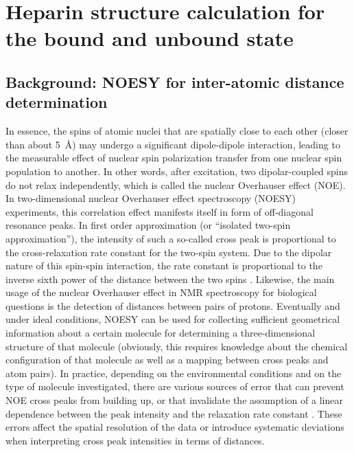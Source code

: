 \section{Heparin structure calculation for the bound and unbound state}

\subsection{Background: NOESY for inter-atomic distance determination}
\label{nmr:noesy_background}


In essence, the spins of atomic nuclei that are spatially close to each other
(closer than about \SI{5}{\angstrom}) may undergo a significant dipole-dipole
interaction, leading to the measurable effect of nuclear spin polarization
transfer from one nuclear spin population to another. In other words, after
excitation, two dipolar-coupled spins do not relax independently, which is
called the nuclear Overhauser effect (NOE). In two-dimensional nuclear
Overhauser effect spectroscopy (NOESY) experiments, this correlation effect
manifests itself in form of off-diagonal resonance peaks. In first order
approximation (or \enquote{isolated two-spin approximation}), the intensity of
such a so-called cross peak is proportional to the cross-relaxation rate
constant for the two-spin system. Due to the dipolar nature of this spin-spin
interaction, the rate constant is proportional to the inverse sixth power of the
distance between the two spins \cite{neuhaus2000_noe}. Likewise, the main usage
of the nuclear Overhauser effect in NMR spectroscopy for biological questions is
the detection of distances between pairs of protons. Eventually and under ideal
conditions, NOESY can be used for collecting sufficient geometrical information
about a certain molecule for determining a three-dimensional structure of that
molecule (obviously, this requires knowledge about the chemical configuration of
that molecule as well as a mapping between cross peaks and atom pairs). In
practice, depending on the environmental conditions and on the type of molecule
investigated, there are various sources of error that can prevent NOE cross
peaks from building up, or that invalidate the assumption of a linear dependence
between the peak intensity and the relaxation rate constant
\cite{palmer_online_nmr_relaxation}. These errors affect the spatial resolution
of the data or introduce systematic deviations when interpreting cross peak
intensities in terms of distances.


